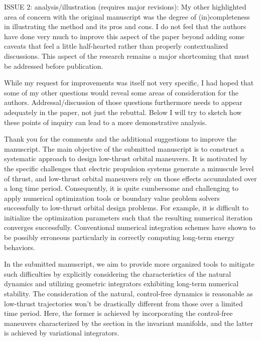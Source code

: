 \documentclass[11pt]{article}
\begin{document}
\begin{itshape}
ISSUE 2: analysis/illustration (requires major revisions): 
My other highlighted area of concern with the original manuscript was the degree of (in)completeness in illustrating the method and its pros and cons.  I do not feel that the authors have done very much to improve this aspect of the paper beyond adding some caveats that feel a little half-hearted rather than properly contextualized discussions.  This aspect of the research remains a major shortcoming that must be addressed before publication.  

While my request for improvements was itself not very specific, I had hoped that some of my other questions would reveal some areas of consideration for the authors.  Addressal/discussion of those questions furthermore needs to appear adequately in the paper, not just the rebuttal. Below I will try to sketch how these points of inquiry can lead to a more demonstrative analysis.
\end{itshape}
\newline\newline
Thank you for the comments and the additional suggestions to improve the manuscript. 
The main objective of the submitted manuscript is to construct a systematic approach to design low-thrust orbital maneuvers. 
It is motivated by the specific challenges that electric propulsion systems generate a minuscule level of thrust, and low-thrust orbital maneuvers rely on those effects accumulated over a long time period. 
Consequently, it is quite cumbersome and challenging to apply numerical optimization tools or boundary value problem solvers successfully to low-thrust orbital design problems. 
For example, it is difficult to initialize the optimization parameters such that the resulting numerical iteration converges successfully. 
Conventional numerical integration schemes have shown to be possibly erroneous particularly in correctly computing long-term energy behaviors. 

In the submitted manuscript, we aim to provide more organized tools to mitigate such difficulties by explicitly considering the characteristics of the natural dynamics and utilizing geometric integrators exhibiting long-term numerical stability. 
The consideration of the natural, control-free dynamics is reasonable as low-thrust trajectories won't be drastically different from those over a limited time period. 
Here, the former is achieved by incorporating the control-free maneuvers characterized by the \Poincare section in the invariant manifolds, and the latter is achieved by variational integrators. 
\end{document}
